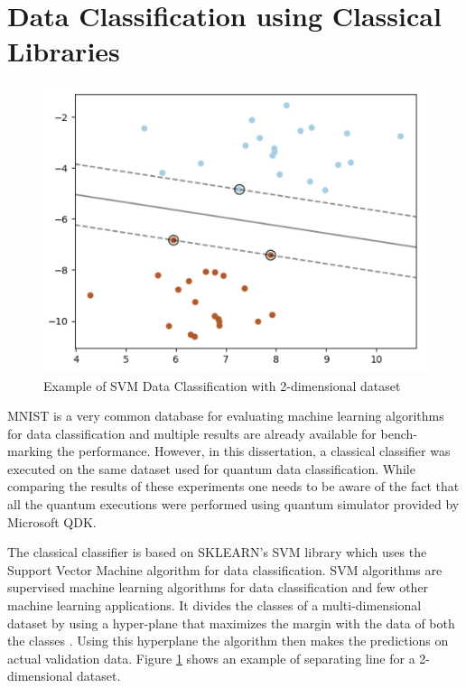 \documentclass[english,a4paper,11pt,oneside,onecolumn]{book}
\begin{document}
\section{Data Classification using Classical Libraries}
\label{sec:classicalDataClass}
\begin{figure}[H]
    \centering
    \includegraphics{Images/SVMHyperplane.PNG}
    \caption{Example of SVM Data Classification with 2-dimensional dataset}
    \label{fig:svmHypPlane}
\end{figure}

MNIST is a very common database for evaluating machine learning algorithms for data classification and multiple results are already available for bench-marking the performance. However, in this dissertation, a classical classifier was executed on the same dataset used for quantum data classification. While comparing the results of these experiments one needs to be aware of the fact that all the quantum executions were performed using quantum simulator provided by Microsoft QDK.

The classical classifier is based on SKLEARN's SVM library \cite{pedregosa_2011_scikitlearn} which uses the Support Vector Machine algorithm for data classification. SVM algorithms are supervised machine learning algorithms for data classification and few other machine learning applications. It divides the classes of a multi-dimensional dataset by using a hyper-plane that maximizes the margin with the data of both the classes \cite{smola_2004_a}. Using this hyperplane the algorithm then makes the predictions on actual validation data. Figure \ref{fig:svmHypPlane} shows an example of separating line for a 2-dimensional dataset.
\end{document}
